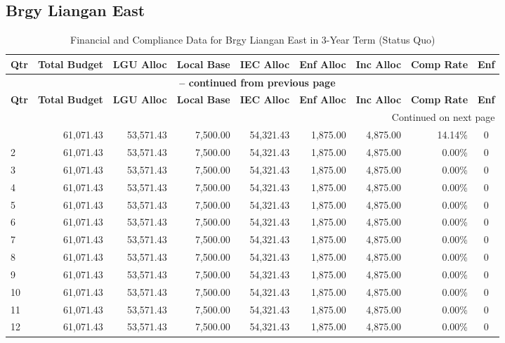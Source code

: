 \subsection{Brgy Liangan East}
\begin{longtable}{lrrrrrrrc}
\caption{Financial and Compliance Data for Brgy Liangan East in 3-Year Term (Status Quo)} \\
\toprule
\textbf{Qtr} & \textbf{Total Budget} & \textbf{LGU Alloc} & \textbf{Local Base} & \textbf{IEC Alloc} & \textbf{Enf Alloc} & \textbf{Inc Alloc} & \textbf{Comp Rate} & \textbf{Enf} \\
\midrule
\endfirsthead
\multicolumn{9}{c}{{\bfseries \tablename\ \thetable{} -- continued from previous page}} \\
\toprule
\textbf{Qtr} & \textbf{Total Budget} & \textbf{LGU Alloc} & \textbf{Local Base} & \textbf{IEC Alloc} & \textbf{Enf Alloc} & \textbf{Inc Alloc} & \textbf{Comp Rate} & \textbf{Enf} \\
\midrule
\endhead
\hline \multicolumn{9}{r}{{Continued on next page}} \\ \hline
\endfoot
\bottomrule
\endlastfoot
1 & 61,071.43 & 53,571.43 & 7,500.00 & 54,321.43 & 1,875.00 & 4,875.00 & 14.14\% & 0 \\
2 & 61,071.43 & 53,571.43 & 7,500.00 & 54,321.43 & 1,875.00 & 4,875.00 & 0.00\% & 0 \\
3 & 61,071.43 & 53,571.43 & 7,500.00 & 54,321.43 & 1,875.00 & 4,875.00 & 0.00\% & 0 \\
4 & 61,071.43 & 53,571.43 & 7,500.00 & 54,321.43 & 1,875.00 & 4,875.00 & 0.00\% & 0 \\
5 & 61,071.43 & 53,571.43 & 7,500.00 & 54,321.43 & 1,875.00 & 4,875.00 & 0.00\% & 0 \\
6 & 61,071.43 & 53,571.43 & 7,500.00 & 54,321.43 & 1,875.00 & 4,875.00 & 0.00\% & 0 \\
7 & 61,071.43 & 53,571.43 & 7,500.00 & 54,321.43 & 1,875.00 & 4,875.00 & 0.00\% & 0 \\
8 & 61,071.43 & 53,571.43 & 7,500.00 & 54,321.43 & 1,875.00 & 4,875.00 & 0.00\% & 0 \\
9 & 61,071.43 & 53,571.43 & 7,500.00 & 54,321.43 & 1,875.00 & 4,875.00 & 0.00\% & 0 \\
10 & 61,071.43 & 53,571.43 & 7,500.00 & 54,321.43 & 1,875.00 & 4,875.00 & 0.00\% & 0 \\
11 & 61,071.43 & 53,571.43 & 7,500.00 & 54,321.43 & 1,875.00 & 4,875.00 & 0.00\% & 0 \\
12 & 61,071.43 & 53,571.43 & 7,500.00 & 54,321.43 & 1,875.00 & 4,875.00 & 0.00\% & 0 \\
\end{longtable}
\clearpage


